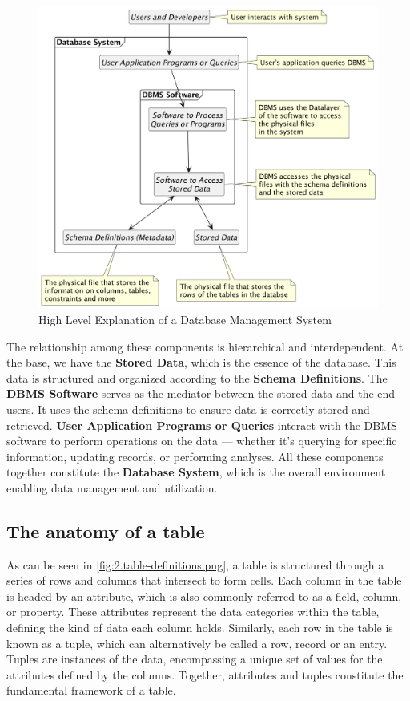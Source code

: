 \begin{figure}[htbp]
    \centering
    \includegraphics[width=1\textwidth]{content/1-relational-databases/figures/1.dbms-definitions.png}
    \caption{High Level Explanation of a Database Management System}
    \label{fig:1.dbms-definitions.png}
\end{figure}

The relationship among these components is hierarchical and interdependent. At the base, we have the \textbf{Stored Data}, which is the essence of the database. This data is structured and organized according to the \textbf{Schema Definitions}. The \textbf{DBMS Software} serves as the mediator between the stored data and the end-users. It uses the schema definitions to ensure data is correctly stored and retrieved. \textbf{User Application Programs or Queries} interact with the DBMS software to perform operations on the data — whether it's querying for specific information, updating records, or performing analyses. All these components together constitute the \textbf{Database System}, which is the overall environment enabling data management and utilization.

\subsection{The anatomy of a table}
As can be seen in \cref{fig:2.table-definitions.png}, a table is structured through a series of rows and columns that intersect to form cells. Each column in the table is headed by an attribute, which is also commonly referred to as a field, column, or property. These attributes represent the data categories within the table, defining the kind of data each column holds. Similarly, each row in the table is known as a tuple, which can alternatively be called a row, record or an entry. Tuples are instances of the data, encompassing a unique set of values for the attributes defined by the columns. Together, attributes and tuples constitute the fundamental framework of a table.

